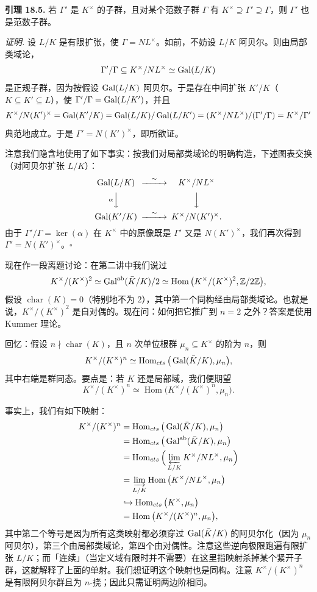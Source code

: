 \textbf{引理 18.5.} 若 $\Gamma'$ 是 $K^\times$ 的子群，且对某个范数子群 $\Gamma$ 有 $K^\times\supseteq\Gamma'\supseteq\Gamma$，则 $\Gamma'$ 也是范数子群。

\textit{证明.} 设 $L/K$ 是有限扩张，使 $\Gamma=NL^\times$。如前，不妨设 $L/K$ 阿贝尔。则由局部类域论，
\[
\Gamma'/\Gamma\subseteq K^\times/NL^\times\simeq\operatorname{Gal}(L/K)
\]
是正规子群，因为按假设 $\operatorname{Gal}(L/K)$ 阿贝尔。于是存在中间扩张 $K'/K$（$K\subseteq K'\subseteq L$），使 $\Gamma'/\Gamma=\operatorname{Gal}(L/K')$，并且
\[
K^\times/N(K')^\times=\operatorname{Gal}(K'/K)=\operatorname{Gal}(L/K)/\operatorname{Gal}(L/K')=(K^\times/NL^\times)/(\Gamma'/\Gamma)=K^\times/\Gamma'
\]
典范地成立。于是 $\Gamma'=N(K')^\times$，即所欲证。

注意我们隐含地使用了如下事实：按我们对局部类域论的明确构造，下述图表交换（对阿贝尔扩张 $L/K$）：
\[
\begin{CD}
\Gal(L/K) @>\sim>> K^\times/NL^\times\\
@V{\alpha}VV @V{}VV\\
\Gal(K'/K) @>\sim>> K^\times/N(K')^\times.
\end{CD}
\]
由于 $\Gamma'/\Gamma=\ker(\alpha)$ 在 $K^\times$ 中的原像既是 $\Gamma'$ 又是 $N(K')^\times$，我们再次得到 $\Gamma'=N(K')^\times$。\hfill$\square$

现在作一段离题讨论：在第二讲中我们说过
\[
K^\times/(K^\times)^2\simeq \operatorname{Gal}^{\mathrm{ab}}(\bar K/K)/2\simeq \operatorname{Hom}\big(K^\times/(K^\times)^2,\mathbb Z/2\mathbb Z\big),
\]
假设 $\operatorname{char}(K)=0$（特别地不为 $2$），其中第一个同构经由局部类域论。也就是说，$K^\times/(K^\times)^2$ 是自对偶的。现在问：如何把它推广到 $n=2$ 之外？答案是使用 Kummer 理论。

回忆：假设 $n\nmid \operatorname{char}(K)$，且 $n$ 次单位根群 $\mu_n\subseteq K^\times$ 的阶为 $n$，则
\[
K^\times/(K^\times)^n\simeq \operatorname{Hom}_{cts}\big(\operatorname{Gal}(\bar K/K),\mu_n\big),
\]
其中右端是群同态。要点是：若 $K$ 还是局部域，我们便期望
\begin{equation}
K^\times/(K^\times)^n\simeq \operatorname{Hom}\big(K^\times/(K^\times)^n,\mu_n\big). \tag{18.1}
\end{equation}

事实上，我们有如下映射：
\begin{align*}
K^\times/(K^\times)^n &= \operatorname{Hom}_{cts}\big(\operatorname{Gal}(\bar K/K),\mu_n\big)\\
&= \operatorname{Hom}_{cts}\big(\operatorname{Gal}^{\mathrm{ab}}(\bar K/K),\mu_n\big)\\
&= \operatorname{Hom}_{cts}\Big(\varprojlim_{L/K}K^\times/NL^\times,\mu_n\Big)\\
&= \varinjlim_{L/K}\operatorname{Hom}\big(K^\times/NL^\times,\mu_n\big)\\
&\hookrightarrow \operatorname{Hom}_{cts}\big(K^\times,\mu_n\big)\\
&= \operatorname{Hom}\big(K^\times/(K^\times)^n,\mu_n\big),
\end{align*}
其中第二个等号是因为所有这类映射都必须穿过 $\operatorname{Gal}(\bar K/K)$ 的阿贝尔化（因为 $\mu_n$ 阿贝尔），第三个由局部类域论，第四个由对偶性。注意这些逆向极限跑遍有限扩张 $L/K$；而「连续」（当定义域有限时并不需要）在这里指映射杀掉某个紧开子群，这就解释了上面的单射。我们想证明这个映射也是同构。注意 $K^\times/(K^\times)^n$ 是有限阿贝尔群且为 $n$-挠；因此只需证明两边阶相同。

